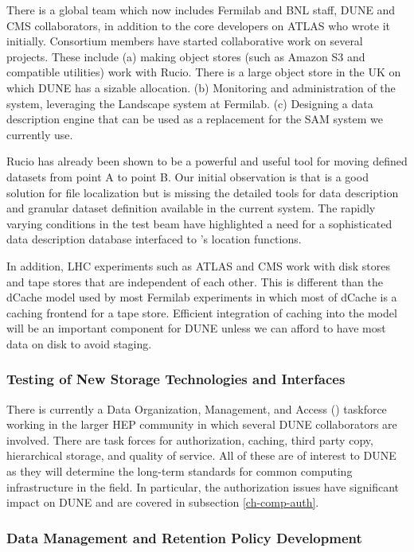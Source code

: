 There is a global  team which now includes Fermilab and BNL staff, DUNE and CMS collaborators,  in addition to the core developers on ATLAS who wrote it initially.  Consortium members have started collaborative work on several projects.   These include (a) making object stores (such as Amazon S3 and compatible utilities) work with Rucio.  There is a large object store in the UK on which DUNE has a sizable allocation.  (b) Monitoring  and administration of the  system, leveraging the Landscape system at Fermilab.  (c) Designing a  data description engine that can be used as a replacement for the SAM system we currently use.

Rucio has already been shown to be a powerful and useful tool for moving defined datasets from point A to point B.  Our initial observation is that  is a good solution for file localization but is missing the detailed tools for data description and granular dataset definition available in the current  system.  The rapidly varying conditions in the test beam have highlighted a need for a sophisticated data description database interfaced to 's location functions. 

In addition,   LHC experiments such as ATLAS and CMS work with disk stores and tape stores that are independent of each other.  This is different than the dCache model used by most Fermilab experiments in which most of dCache is a caching frontend for a tape store.  Efficient integration of caching into the  model will be an important component for DUNE unless  we can afford to have most data on disk to avoid staging.

\subsubsection{Testing of New Storage Technologies and Interfaces}

There is currently a Data Organization, Management, and Access () taskforce working in the larger HEP community
 in which several DUNE collaborators are involved. There are task forces for authorization, caching, third party copy, hierarchical storage, and quality of service. All of these are of interest to DUNE as they will determine the long-term standards for common computing infrastructure in the field. 
In particular, the authorization issues have significant impact on DUNE and are covered in subsection \ref{ch-comp-auth}.


\subsubsection{Data Management and Retention Policy Development}



